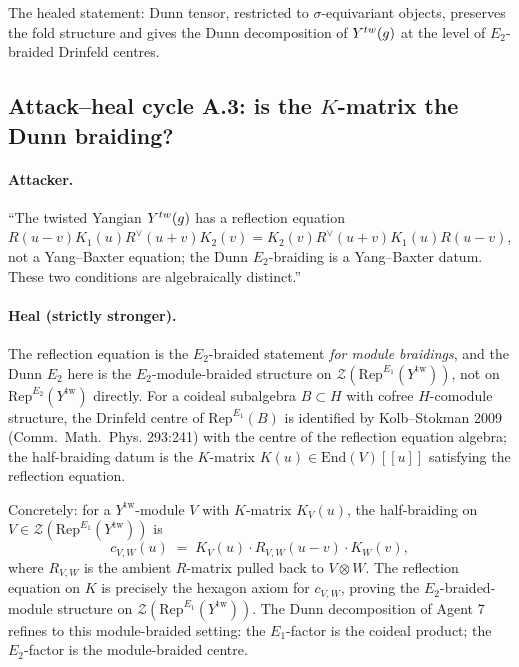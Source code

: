 \documentclass[11pt]{article}
\newcommand{\Eone}{E_{1}}
\newcommand{\Etwo}{E_{2}}
\newcommand{\cZ}{\mathcal{Z}}
\newcommand{\Rep}{\mathrm{Rep}}
\newcommand{\End}{\mathrm{End}}
\newcommand{\frakg}{\mathfrak{g}}
\begin{document}
The healed statement: Dunn tensor, restricted to $\sigma$-equivariant
objects, preserves the fold structure and gives the Dunn decomposition
of $Y^{\mathrm{tw}}(\widehat\frakg)$ at the level of $\Etwo$-braided
Drinfeld centres.

\subsection{Attack--heal cycle A.3: is the $K$-matrix the Dunn braiding?}

\paragraph{Attacker.}
``The twisted Yangian $Y^{\mathrm{tw}}(\widehat\frakg)$ has a reflection
equation $R(u - v) K_1(u) R^{\vee}(u + v) K_2(v) = K_2(v)
R^{\vee}(u + v) K_1(u) R(u - v)$, not a Yang--Baxter equation; the
Dunn $\Etwo$-braiding is a Yang--Baxter datum. These two conditions
are algebraically distinct.''

\paragraph{Heal (strictly stronger).}
The reflection equation is the $\Etwo$-braided statement \emph{for module
braidings}, and the Dunn $\Etwo$ here is the $\Etwo$-module-braided
structure on $\cZ(\Rep^{\Eone}(Y^{\mathrm{tw}}))$, not on
$\Rep^{\Etwo}(Y^{\mathrm{tw}})$ directly. For a coideal subalgebra
$B \subset H$ with cofree $H$-comodule structure, the Drinfeld centre of
$\Rep^{\Eone}(B)$ is identified by Kolb--Stokman 2009 (Comm.~Math.~Phys.
293:241) with the centre of the reflection equation algebra; the
half-braiding datum is the $K$-matrix $K(u) \in \End(V)[[u]]$
satisfying the reflection equation.

Concretely: for a $Y^{\mathrm{tw}}$-module $V$ with $K$-matrix
$K_V(u)$, the half-braiding on $V \in \cZ(\Rep^{\Eone}(Y^{\mathrm{tw}}))$
is
\[
  c_{V, W}(u) \;=\; K_V(u) \cdot R_{V, W}(u - v) \cdot K_W(v),
\]
where $R_{V, W}$ is the ambient $R$-matrix pulled back to
$V \otimes W$. The reflection equation on $K$ is precisely the
hexagon axiom for $c_{V, W}$, proving the $\Etwo$-braided-module
structure on $\cZ(\Rep^{\Eone}(Y^{\mathrm{tw}}))$. The Dunn decomposition
of Agent 7 refines to this module-braided setting: the $\Eone$-factor
is the coideal product; the $\Etwo$-factor is the module-braided
centre.
\end{document}
